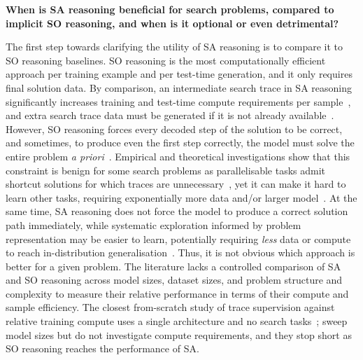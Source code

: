\bigskip

\textbf{When is SA reasoning beneficial for search problems, compared to implicit SO reasoning, and when is it optional or even detrimental?}

\bigskip

The first step towards clarifying the utility of SA reasoning is to compare it to SO reasoning baselines.
SO reasoning is the most computationally efficient approach per training example and per test-time generation, and it only requires final solution data.
By comparison, an intermediate search trace in SA reasoning significantly increases training and test-time compute requirements per sample~\citep{qinBacktrackNotBacktrack2025}, and extra search trace data must be generated if it is not already available~\citep{kimASTROTeachingLanguage2025}.
However, SO reasoning forces every decoded step of the solution to be correct, and sometimes, to produce even the first step correctly, the model must solve the entire problem \textit{a priori}~\citep{bachmannPitfallsNexttokenPrediction2025,gandhiStreamSearchSoS2024}.
Empirical and theoretical investigations show that this constraint is benign for some search problems as parallelisable tasks admit shortcut solutions for which traces are unnecessary~\citep{lehnertBetterPlanningTransformers2024,qinBacktrackNotBacktrack2025,liuTransformersLearnShortcuts2023,sanfordUnderstandingTransformerReasoning2024,yeTransformersProvablyLearn2026,wangALPINEUnveilingPlanning2024}, yet it can make it hard to learn other tasks, requiring exponentially more data and/or larger model~\citep{wenSparseDependenceSparse2025,fengRevealingMysteryChain2023}.
At the same time, SA reasoning does not force the model to produce a correct solution path immediately, while systematic exploration informed by problem representation may be easier to learn, potentially requiring \textit{less} data or compute to reach in-distribution generalisation~\citep{wenSparseDependenceSparse2025,abbeHowFarCan2024}.
Thus, it is not obvious which approach is better for a given problem.
The literature lacks a controlled comparison of SA and SO reasoning across model sizes, dataset sizes, and problem structure and complexity to measure their relative performance in terms of their compute and sample efficiency.
The closest from-scratch study of trace supervision against relative training compute uses a single architecture and no search tasks~\citep{pengmeiKineticsReasoning2025}; \citet{lehnertBetterPlanningTransformers2024} sweep model sizes but do not investigate compute requirements, and they stop short as SO reasoning reaches the performance of SA.

